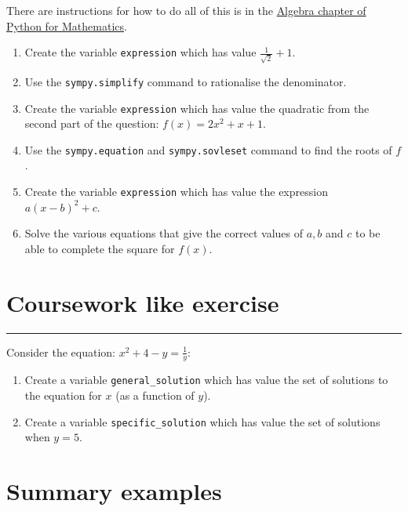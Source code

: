 \documentclass{article}
\begin{document}
There are instructions for how to do all of this is in the
\href{https://vknight.org/pfm/tools-for-mathematics/02-algebra/how/}{Algebra chapter of Python for Mathematics}.


\begin{enumerate}
\item
  Create the variable \texttt{expression} which has value
        $\frac{1}{\sqrt{2}} + 1$.
\item Use the \texttt{sympy.simplify} command to rationalise the
        denominator.
\item Create the variable \texttt{expression} which has value the
        quadratic from the second part of the question: $f(x) = 2x^ 2 + x + 1$.
\item Use the \texttt{sympy.equation} and
        \texttt{sympy.sovleset} command to find the roots of $f$.
\item Create the variable \texttt{expression} which has value the
        expression $a(x-b) ^ 2 + c$.
\item Solve the various equations that give the correct values of $a, b$ and
    $c$ to be able to complete the square for $f(x)$.
\end{enumerate}


\section{Coursework like exercise}
\hrule


Consider the equation: $x ^ 2 + 4 - y = \frac{1}{y}$:

\begin{enumerate}
    \item Create a variable \texttt{general_solution} which has value the set of solutions to
   the equation for $x$ (as a function of $y$).
\item Create a variable \texttt{specific_solution} which has value the set of solutions when $y = 5$. 
\end{enumerate}

\section{Summary examples}
\end{document}
